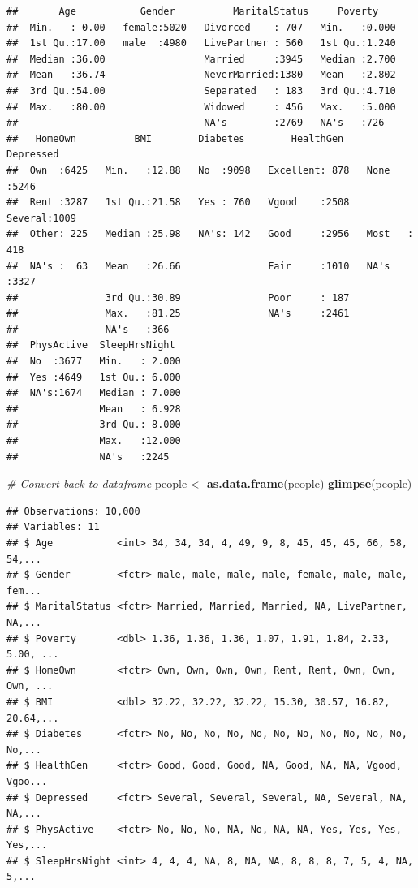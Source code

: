 \documentclass[]{article}
\newenvironment{Shaded}{\begin{snugshade}}{\end{snugshade}}
\newcommand{\KeywordTok}[1]{\textcolor[rgb]{0.13,0.29,0.53}{\textbf{{#1}}}}
\newcommand{\StringTok}[1]{\textcolor[rgb]{0.31,0.60,0.02}{{#1}}}
\newcommand{\CommentTok}[1]{\textcolor[rgb]{0.56,0.35,0.01}{\textit{{#1}}}}
\newcommand{\NormalTok}[1]{{#1}}
\begin{document}
\begin{verbatim}
##       Age           Gender          MaritalStatus     Poverty     
##  Min.   : 0.00   female:5020   Divorced    : 707   Min.   :0.000  
##  1st Qu.:17.00   male  :4980   LivePartner : 560   1st Qu.:1.240  
##  Median :36.00                 Married     :3945   Median :2.700  
##  Mean   :36.74                 NeverMarried:1380   Mean   :2.802  
##  3rd Qu.:54.00                 Separated   : 183   3rd Qu.:4.710  
##  Max.   :80.00                 Widowed     : 456   Max.   :5.000  
##                                NA's        :2769   NA's   :726    
##   HomeOwn          BMI        Diabetes        HealthGen      Depressed   
##  Own  :6425   Min.   :12.88   No  :9098   Excellent: 878   None   :5246  
##  Rent :3287   1st Qu.:21.58   Yes : 760   Vgood    :2508   Several:1009  
##  Other: 225   Median :25.98   NA's: 142   Good     :2956   Most   : 418  
##  NA's :  63   Mean   :26.66               Fair     :1010   NA's   :3327  
##               3rd Qu.:30.89               Poor     : 187                 
##               Max.   :81.25               NA's     :2461                 
##               NA's   :366                                                
##  PhysActive  SleepHrsNight   
##  No  :3677   Min.   : 2.000  
##  Yes :4649   1st Qu.: 6.000  
##  NA's:1674   Median : 7.000  
##              Mean   : 6.928  
##              3rd Qu.: 8.000  
##              Max.   :12.000  
##              NA's   :2245
\end{verbatim}

\begin{Shaded}
\begin{Highlighting}[]
\CommentTok{# Convert back to dataframe}
\NormalTok{people <-}\StringTok{ }\KeywordTok{as.data.frame}\NormalTok{(people)}
\KeywordTok{glimpse}\NormalTok{(people)}
\end{Highlighting}
\end{Shaded}

\begin{verbatim}
## Observations: 10,000
## Variables: 11
## $ Age           <int> 34, 34, 34, 4, 49, 9, 8, 45, 45, 45, 66, 58, 54,...
## $ Gender        <fctr> male, male, male, male, female, male, male, fem...
## $ MaritalStatus <fctr> Married, Married, Married, NA, LivePartner, NA,...
## $ Poverty       <dbl> 1.36, 1.36, 1.36, 1.07, 1.91, 1.84, 2.33, 5.00, ...
## $ HomeOwn       <fctr> Own, Own, Own, Own, Rent, Rent, Own, Own, Own, ...
## $ BMI           <dbl> 32.22, 32.22, 32.22, 15.30, 30.57, 16.82, 20.64,...
## $ Diabetes      <fctr> No, No, No, No, No, No, No, No, No, No, No, No,...
## $ HealthGen     <fctr> Good, Good, Good, NA, Good, NA, NA, Vgood, Vgoo...
## $ Depressed     <fctr> Several, Several, Several, NA, Several, NA, NA,...
## $ PhysActive    <fctr> No, No, No, NA, No, NA, NA, Yes, Yes, Yes, Yes,...
## $ SleepHrsNight <int> 4, 4, 4, NA, 8, NA, NA, 8, 8, 8, 7, 5, 4, NA, 5,...
\end{verbatim}
\end{document}

